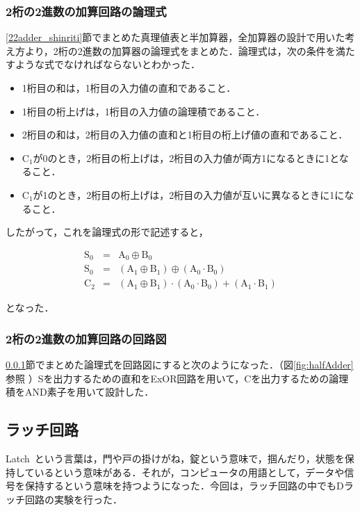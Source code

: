 %
%
\subsubsection{2桁の2進数の加算回路の論理式}
\label{22adder_ronrishiki}
\ref{22adder_shinriti}節でまとめた真理値表と半加算器，全加算器の設計で用いた考え方より，2桁の2進数の加算器の論理式をまとめた．論理式は，次の条件を満たすような式でなければならないとわかった．

\begin{itemize}
	\item 1桁目の和は，1桁目の入力値の直和であること．
	\item 1桁目の桁上げは，1桁目の入力値の論理積であること．
	\item 2桁目の和は，2桁目の入力値の直和と1桁目の桁上げ値の直和であること．
	\item $\mathrm{C_{1}}$が0のとき，2桁目の桁上げは，2桁目の入力値が両方1になるときに1となること．
	\item $\mathrm{C_{1}}$が1のとき，2桁目の桁上げは，2桁目の入力値が互いに異なるときに1になること．
\end{itemize}

したがって，これを論理式の形で記述すると，

\begin{eqnarray}
	\mathrm{S_0} &=&  \mathrm{A_0} \oplus \mathrm{B_0}  \nonumber \\
	\mathrm{S_0} &=& ( \mathrm{A_1} \oplus \mathrm{B_1} )\oplus ( \mathrm{A_0} \cdot \mathrm{B_0} )\nonumber \\
	\mathrm{C_2} &=& ( \mathrm{A_1} \oplus \mathrm{B_1} ) \cdot ( \mathrm{A_0} \cdot \mathrm{B_0} ) + ( \mathrm{A_1} \cdot \mathrm{B_1} )\nonumber
\end{eqnarray}

となった．

%
%
\subsubsection{2桁の2進数の加算回路の回路図}
\label{fulladder_kairozu}
\ref{22adder_ronrishiki}節でまとめた論理式を回路図にすると次のようになった．（図\ref{fig:halfAdder}参照 ）Sを出力するための直和をExOR回路を用いて，Cを出力するための論理積をAND素子を用いて設計した．

%
%
\subsection{ラッチ回路}
\label{experiment_latch}
Latch~という言葉は，門や戸の掛けがね，錠という意味で，掴んだり，状態を保持しているという意味がある．それが，コンピュータの用語として，データや信号を保持するという意味を持つようになった．今回は，ラッチ回路の中でもDラッチ回路の実験を行った．

